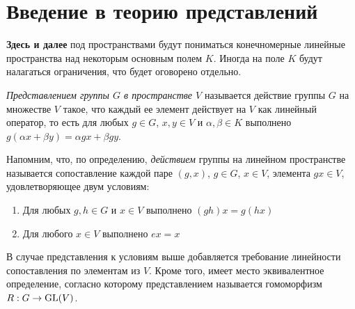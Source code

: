 \section{Введение в теорию представлений}

\textbf{Здесь и далее} под пространствами будут пониматься конечномерные линейные пространства над некоторым основным полем $K$. Иногда на поле $K$ будут налагаться ограничения, что будет оговорено отдельно.

\begin{definition}
	\textit{Представлением группы $G$ в пространстве $V$} называется действие группы $G$ на множестве $V$ такое, что каждый ее элемент действует на $V$ как линейный оператор, то есть для любых $g \in G$,  $x, y \in V$ и $\alpha, \beta \in K$ выполнено $g(\alpha x + \beta y) = \alpha gx + \beta gy$.
\end{definition}

\begin{note}
	Напомним, что, по определению, \textit{действием} группы на линейном пространстве называется сопоставление каждой паре $(g, x)$, $g \in G$, $x \in V$, элемента $gx \in V$, удовлетворяющее двум условиям:
	\begin{enumerate}
		\item Для любых $g, h \in G$ и $x \in V$ выполнено $(gh)x = g(hx)$
		\item Для любого $x \in V$ выполнено $ex = x$
	\end{enumerate}
\end{note}

В случае представления к условиям выше добавляется требование линейности сопоставления по элементам из $V$. Кроме того, имеет место эквивалентное определение, согласно которому представлением называется гомоморфизм $R : G \to \operatorname{GL}(V)$.

